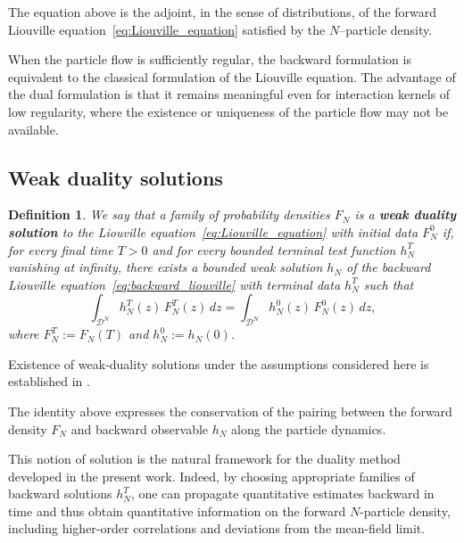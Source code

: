 \documentclass[pdflatex,sn-mathphys-num]{sn-jnl}
\theoremstyle{thmstyleone}%
\theoremstyle{thmstyletwo}%
\theoremstyle{thmstylethree}%
\newtheorem{definition}{Definition}%
\begin{document}
\begin{appendices}
The equation above is the adjoint, in the sense of distributions, of the forward Liouville equation~\eqref{eq:Liouville_equation} satisfied by the $N$--particle density.

When the particle flow is sufficiently regular, the backward formulation is equivalent to the classical formulation of the Liouville equation. The advantage of the dual formulation is that it remains meaningful even for interaction kernels of low regularity, where the existence or uniqueness of the particle flow may not be available.

\subsection*{Weak duality solutions}
\begin{definition}
 We say that a family of probability densities \(F_N\) is a \textbf{weak duality solution} to the Liouville equation~\eqref{eq:Liouville_equation} with initial data \(F_N^0\) if, for every final time \(T>0\) and for every bounded terminal test function \(h_N^T\) vanishing at infinity, there exists a bounded weak solution \(h_N\) of the backward Liouville equation~\eqref{eq:backward_liouville} with terminal data \(h_N^T\) such that
\begin{equation}\label{eq:duality_identity}
\int_{\mathcal{D}^N} h_N^T(z)\, F_N^T(z)\,dz
=
\int_{\mathcal{D}^N} h_N^0(z)\, F_N^0(z)\,dz,
\end{equation}
where \(F_N^T:=F_N(T)\) and \(h_N^0:=h_N(0)\).
\end{definition} 

Existence of weak-duality solutions under the assumptions considered here is established in \cite{bresch2024duality}.

The identity above expresses the conservation of the pairing between the forward density $F_N$ and backward observable $h_N$ along the particle dynamics.

This notion of solution is the natural framework for the duality method developed in the present work. Indeed, by choosing appropriate families of backward solutions $h_N^T$, one can propagate quantitative estimates backward in time and thus obtain quantitative information on the forward \(N\)-particle density, including higher-order correlations and deviations from the mean-field limit.

\end{appendices}



\end{document}
